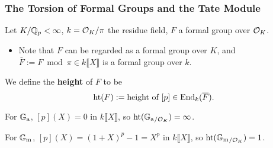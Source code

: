 \subsubsection{The Torsion of Formal Groups and the Tate Module}
Let $K/\mathbb{Q}_p < \infty$, $ k = \mathcal{O}_K/\pi$ the residue field, $F$ a formal group over $\mathcal{O}_K$.
\begin{itemize}
    \item Note that $F$ can be regarded as a formal group over $K$, and $\bar F := F\bmod \pi\in k\llbracket X \rrbracket$ is a formal group over $k$.
\end{itemize}
We define the \textbf{height} of $F$ to be \[\operatorname{ht}(F) := \text{height of } [p]\in\operatorname{End}_k(\overline F).\]
\begin{example}
    For ${\mathbb{G}_{\mathrm{a}}}$, $[p](X) = 0$ in $k\llbracket X \rrbracket$, so $\operatorname{ht}({\mathbb{G}_{\mathrm{a}}}_{/{\mathcal{O}_K}}) = \infty$.

    For ${\mathbb{G}_{\mathrm{m}}}$, $[p](X) = (1 + X)^p - 1 = X^p$ in $k\llbracket X \rrbracket$,
    so $\operatorname{ht}({\mathbb{G}_{\mathrm{m}}}_{/\mathcal{O}_K}) = 1$.
\end{example}

